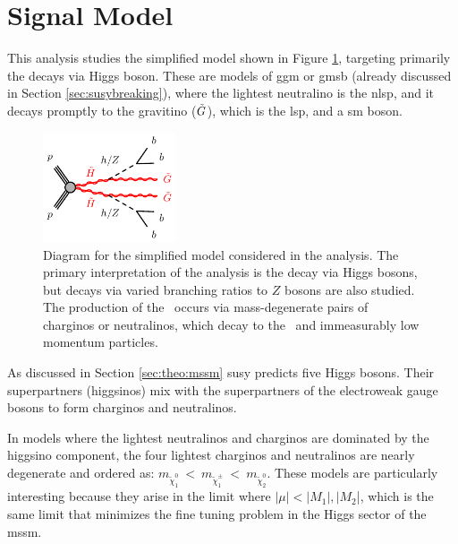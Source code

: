 
\section{Signal Model}
\label{sec:ewk:sig}

This analysis studies the simplified model shown in Figure \ref{fig:feyn}, targeting primarily the decays via Higgs boson.
These are models of \gls{ggm} \cite{Meade:2008wd,Cheung:2007es,Dine:1981gu,AlvarezGaume:1981wy,Nappi:1982hm} 
or \gls{gmsb} \cite{Dimopoulos:1996vz,Matchev:1999ft} (already discussed in Section \ref{sec:susybreaking}), where 
the lightest neutralino is the \gls{nlsp}, and it decays promptly to the gravitino ($\tilde{G}$), which is the \gls{lsp}, and 
a \gls{sm} boson. 

\begin{figure}[htbp]
	\centering
	\includegraphics[width=0.35\textwidth]{figures/ewk_prod/varie/N1N1-hhGG-bbbb_Z}
	\caption{Diagram for the simplified model considered in the analysis. The primary interpretation of the analysis is the decay via Higgs bosons, but decays via varied branching ratios to $Z$ bosons are also studied. The production of the \hino\ occurs
via mass-degenerate pairs of charginos or neutralinos, which decay to the \ninoone\ and immeasurably low momentum particles.} 
	\label{fig:feyn}
\end{figure}

As discussed in Section \ref{sec:theo:mssm} \gls{susy} predicts five Higgs bosons. 
Their superpartners (higgsinos) mix with the superpartners of the electroweak gauge bosons to form charginos and neutralinos.

In models where the lightest neutralinos and charginos are dominated by the higgsino component, the four lightest charginos 
and neutralinos are nearly degenerate \cite{Papucci:2011wy,Barbieri:2009ev,Han:2014kaa} and ordered as: $m_{\tilde\chi^0_1}~<~m_{\tilde\chi^\pm_1}~<~m_{\tilde\chi^0_2}$.
These models are particularly interesting because they arise in the limit where $|\mu| < |M_1|, |M_2$|, which is the same limit 
that minimizes the fine tuning problem in the Higgs sector of the \gls{mssm}.

